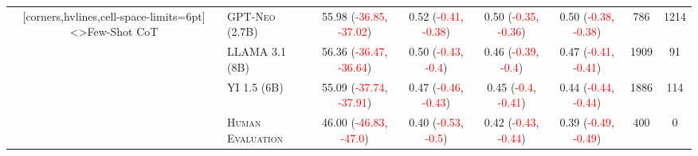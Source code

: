 \documentclass[twocolumn]{article}
\begin{document}
\begin{sidewaystable}[ht]
\begin{NiceTabular}{cl*{6}{c}}[corners,hvlines,cell-space-limits=6pt]
<\rotate>{Few-Shot CoT}
	 & \textsc{GPT-Neo (2.7B)} & 55.98 (\textcolor{Red}{-36.85}, \textcolor{Red}{-37.02}) & 0.52 (\textcolor{Red}{-0.41}, \textcolor{Red}{-0.38}) & 0.50 (\textcolor{Red}{-0.35}, \textcolor{Red}{-0.36}) & 0.50 (\textcolor{Red}{-0.38}, \textcolor{Red}{-0.38}) & 786 & 1214 \\
	 & \textsc{LLAMA 3.1 (8B)} & 56.36 (\textcolor{Red}{-36.47}, \textcolor{Red}{-36.64}) & 0.50 (\textcolor{Red}{-0.43}, \textcolor{Red}{-0.4}) & 0.46 (\textcolor{Red}{-0.39}, \textcolor{Red}{-0.4}) & 0.47 (\textcolor{Red}{-0.41}, \textcolor{Red}{-0.41}) & 1909 & 91 \\
	 & \textsc{YI 1.5 (6B)} & 55.09 (\textcolor{Red}{-37.74}, \textcolor{Red}{-37.91}) & 0.47 (\textcolor{Red}{-0.46}, \textcolor{Red}{-0.43}) & 0.45 (\textcolor{Red}{-0.4}, \textcolor{Red}{-0.41}) & 0.44 (\textcolor{Red}{-0.44}, \textcolor{Red}{-0.44}) & 1886 & 114 \\

	 & \textsc{Human Evaluation} & 46.00 (\textcolor{Red}{-46.83}, \textcolor{Red}{-47.0}) & 0.40 (\textcolor{Red}{-0.53}, \textcolor{Red}{-0.5}) & 0.42 (\textcolor{Red}{-0.43}, \textcolor{Red}{-0.44}) & 0.39 (\textcolor{Red}{-0.49}, \textcolor{Red}{-0.49}) & 400 & 0 \\

\end{NiceTabular}
\end{sidewaystable}
\end{document}
